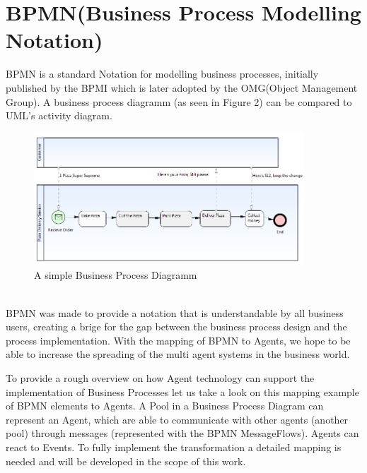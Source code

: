 \section{BPMN(Business Process Modelling Notation)}
BPMN \cite{BPMN2} is a standard Notation for modelling business processes, initially published by the BPMI which is later adopted by the OMG(Object Management Group). A business process diagramm (as seen in Figure 2) can be compared to UML's activity diagram.
\begin{figure}[h]
	\centering
		\includegraphics[width=0.90\textwidth]{images/bpmn_sampl.png}
	\caption{A simple Business Process Diagramm}
	\label{fig:bpmn_sampl}
\end{figure}\\
BPMN was made to provide a notation that is understandable by all business users, creating a brige for the gap between the business process design and the process implementation. With the mapping of BPMN to Agents, we hope to be able to increase the spreading of the multi agent systems in the business world.

To provide a rough overview on how Agent technology can support the implementation of Business Processes let us take a look on this mapping example of BPMN elements to Agents. A Pool in a Business Process Diagram can represent an Agent, which are able to communicate with other agents (another pool) through messages (represented with the BPMN MessageFlows). Agents can react to Events. To fully implement the transformation a detailed mapping is needed and will be developed in the scope of this work. 

